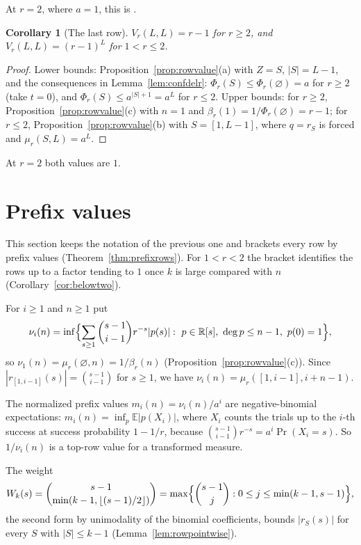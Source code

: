 \documentclass[11pt]{article}
\newtheorem{corollary}[theorem]{Corollary}
\newcommand{\R}{\mathbb R}
\begin{document}
At $r=2$, where $a=1$, this is \cite[Lemma~5.2]{coefficient-mass}.

\begin{corollary}[The last row]\label{cor:lastrowr}
$V_r(L,L)=r-1$ for $r\ge2$, and $V_r(L,L)=(r-1)^L$ for $1<r\le2$.
\end{corollary}

\begin{proof}
Lower bounds: Proposition~\ref{prop:rowvalue}(a) with $Z=S$, $|S|=L-1$,
and the consequences in Lemma~\ref{lem:confdelr}: $\Phi_r(S)\le
\Phi_r(\varnothing)=a$ for $r\ge2$ (take $t=0$), and
$\Phi_r(S)\le a^{|S|+1}=a^L$ for $r\le2$.  Upper bounds: for $r\ge2$,
Proposition~\ref{prop:rowvalue}(c) with $n=1$ and
$\beta_r(1)=1/\Phi_r(\varnothing)=r-1$; for $r\le2$, Proposition~\ref{prop:rowvalue}(b)
with $S=[1,L-1]$, where $q=r_S$ is forced and $\mu_r(S,L)=a^L$.
\end{proof}

At $r=2$ both values are $1$.

\section{Prefix values}\label{sec:prefix}

This section keeps the notation of the previous one and brackets every row
by prefix values (Theorem~\ref{thm:prefixrows}).  For $1<r<2$ the bracket
identifies the rows up to a factor tending to $1$ once $k$ is large
compared with $n$ (Corollary~\ref{cor:belowtwo}).

For $i\ge1$ and $n\ge1$ put
\[
  \nu_i(n)=\inf\Bigl\{\sum_{s\ge1}\binom{s-1}{i-1}r^{-s}|p(s)|:\
  p\in\R[s],\ \deg p\le n-1,\ p(0)=1\Bigr\},
\]
so $\nu_1(n)=\mu_r(\varnothing,n)=1/\beta_r(n)$ (Proposition~\ref{prop:rowvalue}(c)).  Since
$|r_{[1,i-1]}(s)|=\binom{s-1}{i-1}$ for $s\ge1$, we have
$\nu_i(n)=\mu_r([1,i-1],i+n-1)$.

The normalized prefix values $m_i(n)=\nu_i(n)/a^i$ are negative-binomial
expectations: $m_i(n)=\inf_p\mathbb E|p(X_i)|$, where $X_i$ counts the
trials up to the $i$-th success at success probability $1-1/r$, because
$\binom{s-1}{i-1}r^{-s}=a^i\Pr(X_i=s)$.  So $1/\nu_i(n)$ is a top-row value
for a transformed measure.

The weight
\[
  W_k(s)=\binom{s-1}{\min(k-1,\lfloor(s-1)/2\rfloor)}
  =\max\Bigl\{\binom{s-1}j:0\le j\le\min(k-1,s-1)\Bigr\},
\]
the second form by unimodality of the binomial coefficients, bounds
$|r_S(s)|$ for every $S$ with $|S|\le k-1$ (Lemma~\ref{lem:rowpointwise}).
\end{document}

